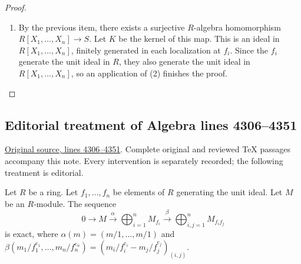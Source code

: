 \begin{proof}
\begin{enumerate}
For each $x\in X_i$, write $x=y_x/f_i^{a_x}$ with
$y_x\in S$ and $a_x\geq0$, and put $Y_i=\{y_x\mid x\in X_i\}$.
The equalities $y_x/1=f_i^{a_x}x$ and
$x=f_i^{-a_x}(y_x/1)$ show that the images of $Y_i$ generate
the same $R_{f_i}$-subalgebra as $X_i$, because both scalar factors
belong to the base ring $R_{f_i}$. Let $Y$ be the union of the
finite sets $Y_i$; it is finite.
Consider the algebra homomorphism $R[X_y]_{y \in Y} \rightarrow S$
induced by $Y$. Since it is an algebra homomorphism, the image $T$
is an $R$-submodule of the $R$-module $S$, so we can consider the
quotient module $S/T$. By assumption, this is zero if we localize
at the $f_i$, so it is zero by (1) and therefore $S$ is an
$R$-algebra of finite type.
\item By the previous item, there exists a surjective $R$-algebra
homomorphism $R[X_1, \ldots, X_n] \rightarrow S$. Let $K$ be the kernel
of this map. This is an ideal in $R[X_1, \ldots, X_n]$, finitely generated
in each localization at $f_i$. Since the $f_i$ generate the unit ideal
in $R$, they also generate the unit ideal in $R[X_1, \ldots, X_n]$, so an
application of (2) finishes the proof.
\end{enumerate}
\end{proof}


\subsection{Editorial treatment of Algebra lines 4306--4351}

\hypertarget{algebra-context-021}{}

\noindent\href{https://github.com/stacks/stacks-project/blob/a04446e57ec1fbc252a871afcec7752fb2807b14/algebra.tex\#L4306}{Original source, lines 4306--4351}. Complete original and reviewed TeX passages accompany this note. Every intervention is separately recorded; the following treatment is editorial.


\begin{lemma}
\label{editorial-source-lemma-cover-module}
Let $R$ be a ring. Let $f_1, \ldots, f_n$ be elements of $R$
generating the unit ideal. Let $M$ be an $R$-module.
The sequence
$$
0 \to
M \xrightarrow{\alpha}
\bigoplus\nolimits_{i = 1}^n M_{f_i} \xrightarrow{\beta}
\bigoplus\nolimits_{i, j = 1}^n M_{f_i f_j}
$$
is exact, where $\alpha(m) = (m/1, \ldots, m/1)$
and $\beta(m_1/f_1^{e_1}, \ldots, m_n/f_n^{e_n})
= (m_i/f_i^{e_i} - m_j/f_j^{e_j})_{(i, j)}$.
\end{lemma}

